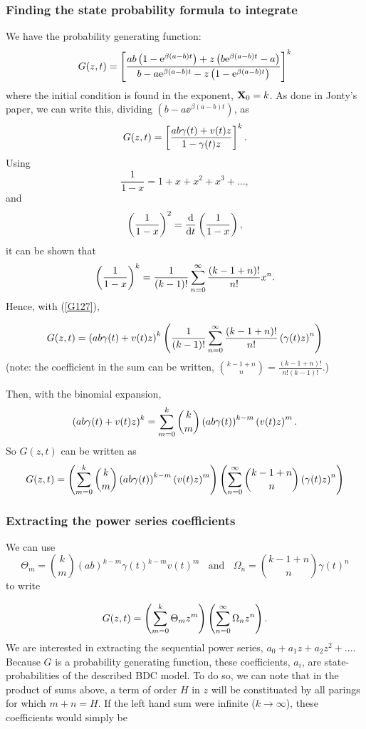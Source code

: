 \subsubsection{Finding the state probability formula to integrate}
We have the probability generating function:
$$G(z,t) = \left[\frac{ab\left(1 - {\rm e}^{\beta (a-b) t}\right) + z\left( b{\rm e}^{\beta(a-b) t} -a\right) }{ b-a{\rm e}^{\beta(a-b)t} - z\left(1 - {\rm e}^{\beta(a-b)t}\right)   }\right]^k$$
where the initial condition is found in the exponent, ${\bf X}_0 = k$. As done in Jonty's paper, we can write this, dividing $(b-a\ee^{\beta(a-b) t})$, as
\begin{equation}
\label{G127}
G(z,t)  = \left[\frac{ab\gamma(t) + v(t) z }{ 1- \gamma(t)z }\right]^k.
\end{equation}
Using 
$$\frac{1}{1-x} = 1+x+x^2+x^3+\dots,$$
and 
$$\left(\frac{1}{1-x}\right)^2 = \displaystyle\frac{{\rm d} }{{\rm d} t}\left(\frac{1}{1-x}\right),$$
it can be shown that 
$$\left(\frac{1}{1-x}\right)^k   = \frac{1}{(k-1)!} \sum^\infty_{n=0} \frac{(k-1+n)!}{n!} x^n.$$
Hence, with (\ref{G127}), 

$$G(z,t)  = \left( ab\gamma(t) + v(t) z \right)^k \left( \frac{1}{(k-1)!} \sum^\infty_{n=0} \frac{(k-1+n)!}{n!} \left(\gamma(t) z\right)^n\right)$$
(note: the coefficient in the sum can be written, ${ k-1+n \choose n } = \frac{(k-1+n)!}{n! (k-1)!}$.)\par
Then, with the binomial expansion,
$$\left( ab\gamma(t) + v(t) z\right)^k =  \sum^{k}_{m=0} {k\choose m} \left( ab\gamma(t)\right)^{k-m} \left( v(t) z\right)^m.$$
So $G(z,t)$ can be written as 
$$G(z,t) =   \left( \sum^{k}_{m=0} {k\choose m} \left( ab\gamma(t)\right)^{k-m} \left( v(t) z\right)^m   \right) \left(   \sum^\infty_{n=0} { k-1+n \choose n } \left(\gamma(t) z\right)^n\right)$$





\subsubsection{Extracting the power series coefficients}

We can use 
$$\Theta_m  = {k \choose m} (ab)^{k-m} \gamma(t)^{k-m} v(t)^m  \;\;\text{ and }\;\; \Omega_n = {k-1+n \choose n} \gamma(t)^n$$
to write

$$G(z,t) = \left(\sum^k_{m=0} \Theta_m z^m\right) \left(\sum^{\infty}_{n=0}  \Omega_n z^n\right).$$
We are interested in extracting the sequential power series, $a_0 + a_1 z+ a_2z^2+ \dots$. Because $G$ is a probability generating function, these coefficients, $a_i$, are state-probabilities of the described BDC model. To do so, we can note that in the product of sums above, a term of order $H$ in $z$ will be constituated by all parings for which $m+n = H$. If the left hand sum were infinite ($k\to\infty$), these coefficients would simply be

